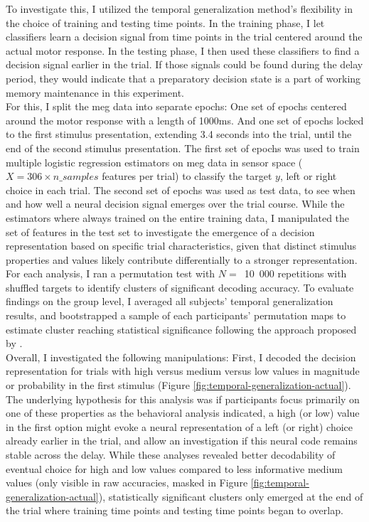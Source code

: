 To investigate this, I utilized the temporal generalization method's flexibility in the choice of training and testing time points.
In the training phase, I let classifiers learn a decision signal from time points in the trial centered around the actual motor response.
In the testing phase, I then used these classifiers to find a decision signal earlier in the trial.
If those signals could be found during the delay period, they would indicate that a preparatory decision state is a part of working memory maintenance in this experiment. \\
For this, I split the \gls{meg} data into separate epochs:
One set of epochs centered around the motor response with a length of 1000ms.
And one set of epochs locked to the first stimulus presentation, extending 3.4 seconds into the trial, until the end of the second stimulus presentation.
The first set of epochs was used to train multiple logistic regression estimators on \gls{meg} data in sensor space ($X=306 \times n\_samples$ features per trial) to classify the target $y$, left or right choice in each trial.
The second set of epochs was used as test data, to see when and how well a neural decision signal emerges over the trial course.
While the estimators where always trained on the entire training data, I manipulated the set of features in the test set to investigate the emergence of a decision representation based on specific trial characteristics, given that distinct stimulus properties and values likely contribute differentially to a stronger representation.
For each analysis, I ran a permutation test with $N=$~10~000 repetitions with shuffled targets to identify clusters of significant decoding accuracy.
To evaluate findings on the group level, I averaged all subjects' temporal generalization results, and bootstrapped a sample of each participants' permutation maps to estimate cluster reaching statistical significance following the approach proposed by \citet{stelzer2013statistical}.\\
Overall, I investigated the following manipulations:
First, I decoded the decision representation for trials with high versus medium versus low values in magnitude or probability in the first stimulus (Figure \ref{fig:temporal-generalization-actual}).
The underlying hypothesis for this analysis was if participants focus primarily on one of these properties as the behavioral analysis indicated, a high (or low) value in the first option might evoke a neural representation of a left (or right) choice already earlier in the trial, and allow an investigation if this neural code remains stable across the delay.
While these analyses revealed better decodability of eventual choice for high and low values compared to less informative medium values (only visible in raw accuracies, masked in Figure \ref{fig:temporal-generalization-actual}), statistically significant clusters only emerged at the end of the trial where training time points and testing time points began to overlap.


